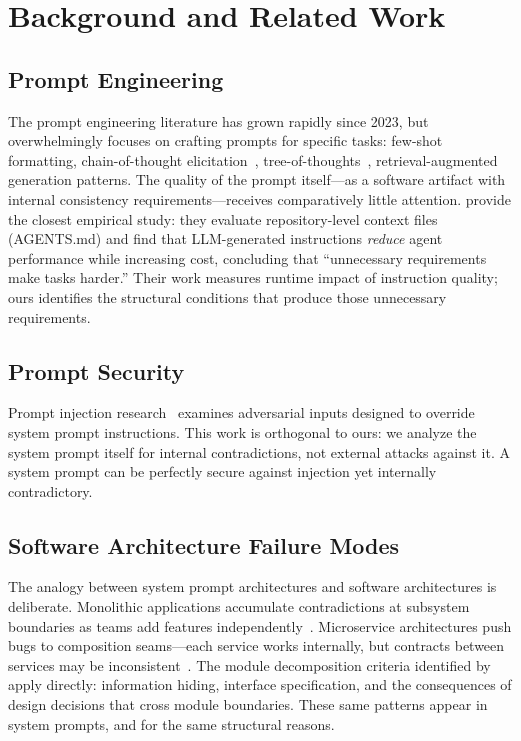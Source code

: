 \documentclass[11pt,a4paper]{article}
\begin{document}
\section{Background and Related Work}
\label{sec:background}

\subsection{Prompt Engineering}

The prompt engineering literature has grown rapidly since 2023, but
overwhelmingly focuses on crafting prompts for specific tasks: few-shot
formatting, chain-of-thought elicitation~\citep{wei2022chain},
tree-of-thoughts~\citep{yao2023tree}, retrieval-augmented generation
patterns. The quality of the prompt itself---as a software artifact with
internal consistency requirements---receives comparatively little
attention. \citet{gloaguen2026evaluating} provide the closest
empirical study: they evaluate repository-level context files
(AGENTS.md) and find that LLM-generated instructions \emph{reduce}
agent performance while increasing cost, concluding that ``unnecessary
requirements make tasks harder.'' Their work measures runtime impact of
instruction quality; ours identifies the structural conditions that
produce those unnecessary requirements.

\subsection{Prompt Security}

Prompt injection research~\citep{schulhoff2023ignore, greshake2023not,
liu2023prompt} examines adversarial inputs designed to override system
prompt instructions. This work is orthogonal to ours: we analyze the
system prompt itself for internal contradictions, not external attacks
against it. A system prompt can be perfectly secure against injection
yet internally contradictory.

\subsection{Software Architecture Failure Modes}

The analogy between system prompt architectures and software
architectures is deliberate. Monolithic applications accumulate
contradictions at subsystem boundaries as teams add features
independently~\citep{conway1968committees}. Microservice architectures
push bugs to composition seams---each service works internally, but
contracts between services may be
inconsistent~\citep{newman2021building}. The module decomposition
criteria identified by~\citet{parnas1972criteria} apply directly:
information hiding, interface specification, and the consequences of
design decisions that cross module boundaries. These same patterns
appear in system prompts, and for the same structural reasons.
\end{document}
